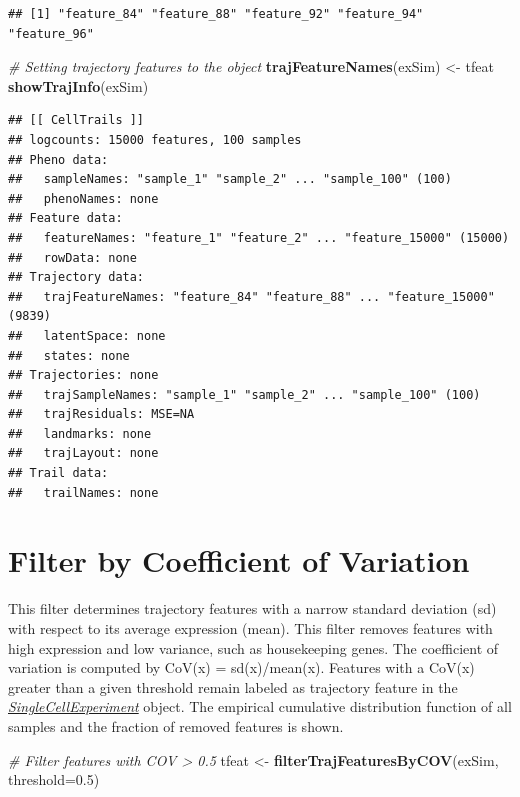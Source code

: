 \documentclass[]{book}
\newenvironment{Shaded}{\begin{snugshade}}{\end{snugshade}}
\newcommand{\KeywordTok}[1]{\textcolor[rgb]{0.13,0.29,0.53}{\textbf{#1}}}
\newcommand{\DataTypeTok}[1]{\textcolor[rgb]{0.13,0.29,0.53}{#1}}
\newcommand{\FloatTok}[1]{\textcolor[rgb]{0.00,0.00,0.81}{#1}}
\newcommand{\StringTok}[1]{\textcolor[rgb]{0.31,0.60,0.02}{#1}}
\newcommand{\CommentTok}[1]{\textcolor[rgb]{0.56,0.35,0.01}{\textit{#1}}}
\newcommand{\NormalTok}[1]{#1}
\theoremstyle{definition}
\theoremstyle{definition}
\theoremstyle{definition}
\theoremstyle{remark}
\begin{document}
\begin{verbatim}
## [1] "feature_84" "feature_88" "feature_92" "feature_94" "feature_96"
\end{verbatim}

\begin{Shaded}
\begin{Highlighting}[]
\CommentTok{# Setting trajectory features to the object}
\KeywordTok{trajFeatureNames}\NormalTok{(exSim) <-}\StringTok{ }\NormalTok{tfeat}
\KeywordTok{showTrajInfo}\NormalTok{(exSim)}
\end{Highlighting}
\end{Shaded}

\begin{verbatim}
## [[ CellTrails ]] 
## logcounts: 15000 features, 100 samples
## Pheno data: 
##   sampleNames: "sample_1" "sample_2" ... "sample_100" (100)
##   phenoNames: none
## Feature data: 
##   featureNames: "feature_1" "feature_2" ... "feature_15000" (15000)
##   rowData: none
## Trajectory data: 
##   trajFeatureNames: "feature_84" "feature_88" ... "feature_15000" (9839)
##   latentSpace: none
##   states: none
## Trajectories: none
##   trajSampleNames: "sample_1" "sample_2" ... "sample_100" (100)
##   trajResiduals: MSE=NA
##   landmarks: none
##   trajLayout: none
## Trail data: 
##   trailNames: none
\end{verbatim}

\section{Filter by Coefficient of
Variation}\label{filter-by-coefficient-of-variation}

This filter determines trajectory features with a narrow standard
deviation (sd) with respect to its average expression (mean). This
filter removes features with high expression and low variance, such as
housekeeping genes. The coefficient of variation is computed by CoV(x) =
sd(x)/mean(x). Features with a CoV(x) greater than a given threshold
remain labeled as trajectory feature in the
\emph{\href{http://bioconductor.org/packages/SingleCellExperiment}{SingleCellExperiment}}
object. The empirical cumulative distribution function of all samples
and the fraction of removed features is shown.

\begin{Shaded}
\begin{Highlighting}[]
\CommentTok{# Filter features with COV > 0.5}
\NormalTok{tfeat <-}\StringTok{ }\KeywordTok{filterTrajFeaturesByCOV}\NormalTok{(exSim, }\DataTypeTok{threshold=}\FloatTok{0.5}\NormalTok{)}
\end{Highlighting}
\end{Shaded}
\end{document}
